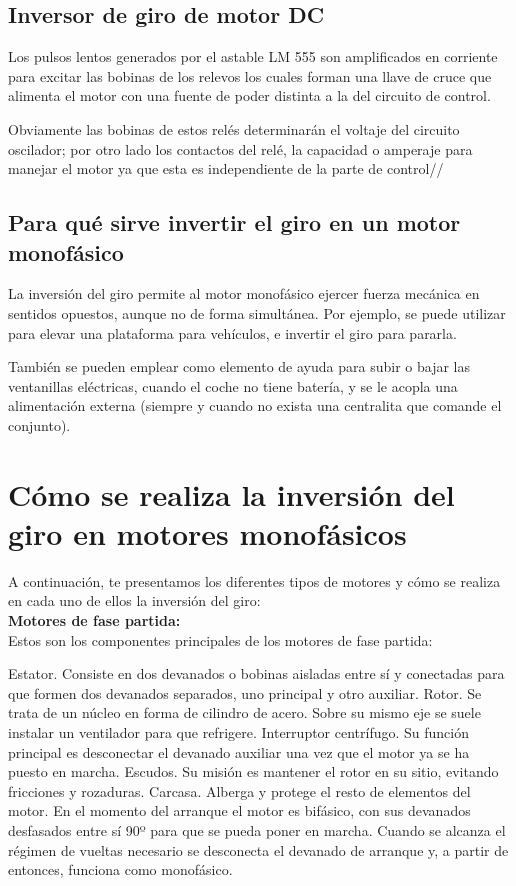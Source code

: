 \documentclass[12pt,a4paper]{article}
\begin{document}
\subsection{Inversor de giro de motor DC}
Los pulsos lentos generados por el astable LM 555 son amplificados en corriente para excitar las bobinas de los relevos los cuales forman una llave de cruce que alimenta el motor con una fuente de poder distinta a la del circuito de control.

Obviamente las bobinas de estos relés determinarán el voltaje del circuito oscilador; por otro lado los contactos del relé, la capacidad o amperaje para manejar el motor ya que esta es independiente de la parte de control//



\subsection{Para qué sirve invertir el giro en un motor monofásico}
La inversión del giro permite al motor monofásico ejercer fuerza mecánica en sentidos opuestos, aunque no de forma simultánea. Por ejemplo, se puede utilizar para elevar una plataforma para vehículos, e invertir el giro para pararla.

También se pueden emplear como elemento de ayuda para subir o bajar las ventanillas eléctricas, cuando el coche no tiene batería, y se le acopla una alimentación externa (siempre y cuando no exista una centralita que comande el conjunto).


\section{Cómo se realiza la inversión del giro en motores monofásicos}
A continuación, te presentamos los diferentes tipos de motores y cómo se realiza en cada uno de ellos la inversión del giro:\\

\textbf{Motores de fase partida:}\\
Estos son los componentes principales de los motores de fase partida:

Estator. Consiste en dos devanados o bobinas aisladas entre sí y conectadas para que formen dos devanados separados, uno principal y otro auxiliar. 
Rotor. Se trata de un núcleo en forma de cilindro de acero. Sobre su mismo eje se suele instalar un ventilador para que refrigere. 
Interruptor centrífugo. Su función principal es desconectar el devanado auxiliar una vez que el motor ya se ha puesto en marcha.
Escudos. Su misión es mantener el rotor en su sitio, evitando fricciones y rozaduras.
Carcasa. Alberga y protege el resto de elementos del motor.
En el momento del arranque el motor es bifásico, con sus devanados desfasados entre sí 90º para que se pueda poner en marcha. Cuando se alcanza el régimen de vueltas necesario se desconecta el devanado de arranque y, a partir de entonces, funciona como monofásico.
\end{document}
